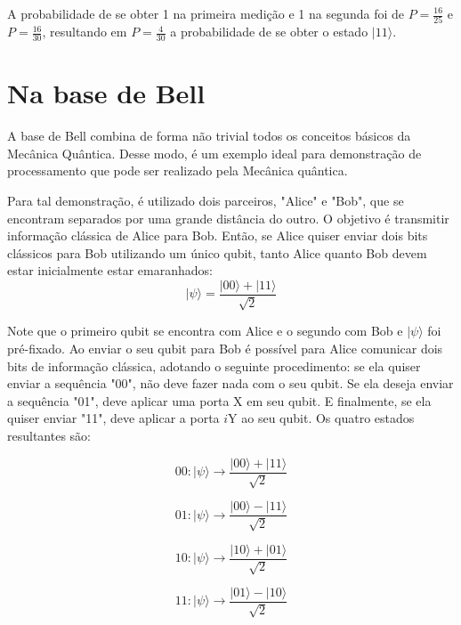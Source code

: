 \documentclass[tcc,capa]{texufpel}
\begin{document}
A probabilidade de se obter 1 na primeira medição e 1 na segunda foi de $P=\frac{16}{25}$ e $P=\frac{16}{30}$, resultando em $P=\frac{4}{30}$ a probabilidade de se obter o estado $|11\rangle$. 


\section{Na base de Bell}

A base de Bell combina de forma não trivial todos os conceitos básicos da Mecânica Quântica. Desse modo, é um exemplo ideal para demonstração de processamento que pode ser realizado pela Mecânica quântica.

Para tal demonstração, é utilizado dois parceiros, "Alice" e "Bob", que se encontram separados por uma grande distância do outro. O objetivo é transmitir informação clássica de Alice para Bob. Então, se Alice quiser enviar dois bits clássicos para Bob utilizando um único qubit, tanto Alice quanto Bob devem estar inicialmente estar emaranhados:
\begin{equation}
    |\psi\rangle = \frac{|00\rangle+|11\rangle}{\sqrt{2}}
\end{equation}

Note que o primeiro qubit se encontra com Alice e o segundo com Bob e $|\psi\rangle$ foi  pré-fixado. Ao enviar o seu qubit para Bob é possível para Alice comunicar dois bits de informação clássica, adotando o seguinte procedimento: se ela quiser enviar a sequência "00", não deve fazer nada com o seu qubit. Se ela deseja enviar a sequência "01", deve aplicar uma porta X em seu qubit. E finalmente, se ela quiser enviar "11", deve aplicar a porta $i$Y ao seu qubit. Os quatro estados resultantes são:

\begin{equation}
    00: |\psi\rangle \rightarrow \frac{|00\rangle+|11\rangle}{\sqrt{2}}
\end{equation}

\begin{equation}
   01: |\psi\rangle \rightarrow \frac{|00\rangle-|11\rangle}{\sqrt{2}}
\end{equation}

\begin{equation}
    10: |\psi\rangle \rightarrow \frac{|10\rangle+|01\rangle}{\sqrt{2}}
\end{equation}

\begin{equation}    
    11: |\psi\rangle \rightarrow \frac{|01\rangle-|10\rangle}{\sqrt{2}}
\end{equation}
    
\end{document}
